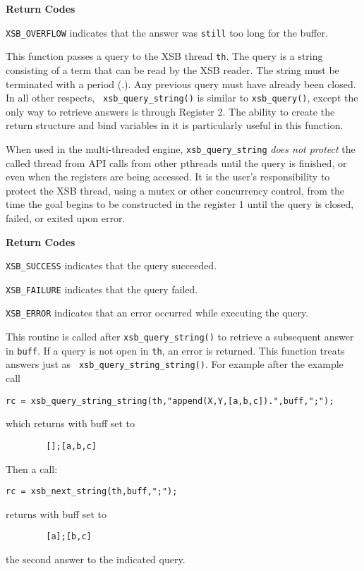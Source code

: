 \begin{description}
{\bf Return Codes}  
\bi
\item {\tt XSB\_OVERFLOW} indicates that the answer was {\tt still}
  too long for the buffer.  
\ei

%
This function passes a query to the XSB thread {\tt th}.  The query is
a string consisting of a term that can be read by the XSB reader.  The
string must be terminated with a period (.).  Any previous query must
have already been closed.  In all other respects, {\tt
  xsb\_query\_string()} is similar to {\tt xsb\_query()}, except the
only way to retrieve answers is through Register 2.  The ability to
create the return structure and bind variables in it is particularly
useful in this function.

When used in the multi-threaded engine, {\tt xsb\_query\_string} {\em
  does not protect} the called thread from API calls from other
pthreads until the query is finished, or even when the registers are
being accessed.  It is the user's responsibility to protect the XSB
thread, using a mutex or other concurrency control, from the time the
goal begins to be constructed in the register 1 until the query is
closed, failed, or exited upon error.

{\bf Return Codes}  
\bi
\item {\tt XSB\_SUCCESS} indicates that the query succeeded.
%
\item {\tt XSB\_FAILURE} indicates that the query failed.
%
\item {\tt XSB\_ERROR} indicates that an error occurred while
  executing the query.  
%
\ei

%
This routine is called after {\tt xsb\_query\_string()} to retrieve a
subsequent answer in {\tt buff}.  If a query is not open in {\tt th},
an error is returned.  This function treats answers just as {\tt
  xsb\_query\_string\_string()}.  For example after the example call
\begin{verbatim}
rc = xsb_query_string_string(th,"append(X,Y,[a,b,c]).",buff,";");
\end{verbatim}
which returns with buff set to 
\begin{verbatim}
        [];[a,b,c]
\end{verbatim}
Then a call:
\begin{verbatim}
rc = xsb_next_string(th,buff,";");
\end{verbatim}
returns with buff set to 
\begin{verbatim}
        [a];[b,c]
\end{verbatim}
the second answer to the indicated query. 


\end{description}
